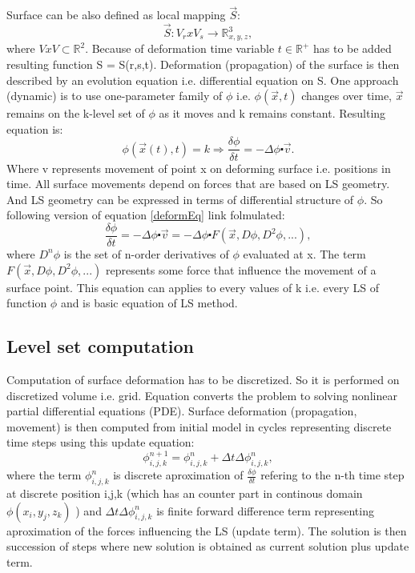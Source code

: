 Surface can be also defined as local mapping $\vec{S}$:
\begin{equation}
\vec{S}: V_r x V_s \rightarrow \mathbb R^3_{x,y,z},
\end{equation}
where $V x V \subset \mathbb R^2$. Because of deformation time variable $t \in \mathbb R^+$ has to be added resulting function S = S(r,s,t). 
Deformation (propagation) of the surface is then described by an evolution equation i.e. differential equation on S. One approach (dynamic) is to use one-parameter family of $\phi$ i.e. $\phi(\vec{x},t)$ changes over time, $\vec{x}$ remains on the k-level set of $\phi$ as it moves and k remains constant. Resulting equation is:
\begin{equation}
\label{deformEq}
\phi(\vec{x}(t),t) = k \Rightarrow \frac{\delta \phi}{\delta t} = - \Delta \phi \centerdot \vec{v}.
\end{equation}
Where v represents movement of point x on deforming surface i.e. positions in time.
All surface movements depend on forces that are based on LS geometry. And LS geometry can be expressed in terms of differential structure of $\phi$. So following version of equation \ref{deformEq} link folmulated:
\begin{equation}
\frac{\delta\phi}{\delta t} = - \Delta \phi \centerdot \vec{v} = - \Delta \phi \centerdot F(\vec{x}, D\phi, D^2\phi, ...),
\end{equation}
where $D^n\phi$ is the set of n-order derivatives of $\phi$ evaluated at x. The term $F(\vec{x}, D\phi, D^2\phi, ...)$ represents some force that influence the movement of a surface point. This equation can applies to every values of k i.e. every LS of function $\phi$ and is basic equation of LS method.

\subsection{Level set computation}

Computation of surface deformation has to be discretized. So it is performed on discretized volume i.e. grid. Equation converts the problem to solving nonlinear partial differential equations (PDE). Surface deformation (propagation, movement) is then computed from initial model in cycles representing discrete time steps using this update equation:
\begin{equation}
\label{deformEqApprox}
\phi_{i,j,k}^{n+1} = \phi_{i,j,k}^{n} + \Delta t \Delta \phi_{i,j,k}^{n},
\end{equation}
where the term $\phi_{i,j,k}^{n}$ is discrete aproximation of $\frac{\delta\phi}{\delta t}$ refering to the n-th time step at discrete position i,j,k (which has an counter part in continous domain $\phi(x_i, y_j, z_k)$ ) and $\Delta t \Delta \phi_{i,j,k}^{n}$ is finite forward difference term representing aproximation of the forces influencing the LS (update term). The solution is then succession of steps where new solution is obtained as current solution plus update term.

